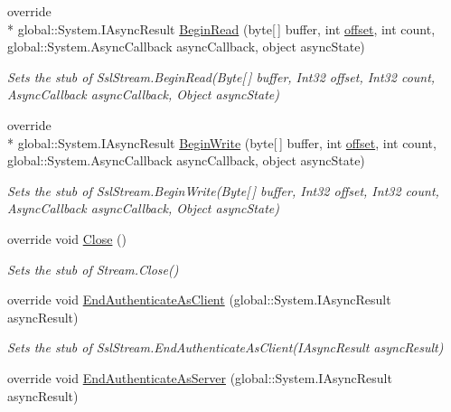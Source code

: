 \begin{DoxyCompactItemize}
override \\*
global\-::\-System.\-I\-Async\-Result \hyperlink{class_system_1_1_net_1_1_security_1_1_fakes_1_1_stub_ssl_stream_a172b4024896862265cf148e19e53d17b}{Begin\-Read} (byte\mbox{[}$\,$\mbox{]} buffer, int \hyperlink{jquery-1_810_82_8js_a4a9f594d20d927164551fc7fa4751a2f}{offset}, int count, global\-::\-System.\-Async\-Callback async\-Callback, object async\-State)
\begin{DoxyCompactList}\small\item\em Sets the stub of Ssl\-Stream.\-Begin\-Read(\-Byte\mbox{[}$\,$\mbox{]} buffer, Int32 offset, Int32 count, Async\-Callback async\-Callback, Object async\-State)\end{DoxyCompactList}\item 
override \\*
global\-::\-System.\-I\-Async\-Result \hyperlink{class_system_1_1_net_1_1_security_1_1_fakes_1_1_stub_ssl_stream_ab225a704c2999fa1ef58cae67575427a}{Begin\-Write} (byte\mbox{[}$\,$\mbox{]} buffer, int \hyperlink{jquery-1_810_82_8js_a4a9f594d20d927164551fc7fa4751a2f}{offset}, int count, global\-::\-System.\-Async\-Callback async\-Callback, object async\-State)
\begin{DoxyCompactList}\small\item\em Sets the stub of Ssl\-Stream.\-Begin\-Write(\-Byte\mbox{[}$\,$\mbox{]} buffer, Int32 offset, Int32 count, Async\-Callback async\-Callback, Object async\-State)\end{DoxyCompactList}\item 
override void \hyperlink{class_system_1_1_net_1_1_security_1_1_fakes_1_1_stub_ssl_stream_a64a8e9401ce33bc75cbb30f455f8afc9}{Close} ()
\begin{DoxyCompactList}\small\item\em Sets the stub of Stream.\-Close()\end{DoxyCompactList}\item 
override void \hyperlink{class_system_1_1_net_1_1_security_1_1_fakes_1_1_stub_ssl_stream_a0965b3545201144648515d38c4d18054}{End\-Authenticate\-As\-Client} (global\-::\-System.\-I\-Async\-Result async\-Result)
\begin{DoxyCompactList}\small\item\em Sets the stub of Ssl\-Stream.\-End\-Authenticate\-As\-Client(\-I\-Async\-Result async\-Result)\end{DoxyCompactList}\item 
override void \hyperlink{class_system_1_1_net_1_1_security_1_1_fakes_1_1_stub_ssl_stream_a9888f196f062b88742a9e3b293a4c119}{End\-Authenticate\-As\-Server} (global\-::\-System.\-I\-Async\-Result async\-Result)

\end{DoxyCompactItemize}
